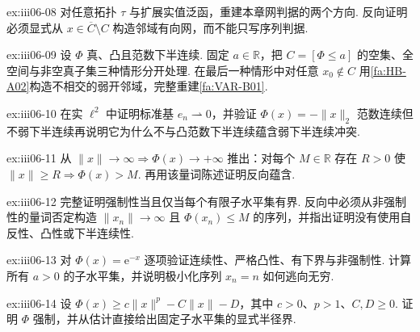 \begin{FAExercise}[网下极限判据]{ex:iii06-08}
对任意拓扑 \(\displaystyle\tau\) 与扩展实值泛函，重建本章网判据的两个方向. 反向证明必须显式从 \(\displaystyle x\in\overline C\setminus C\) 构造邻域有向网，而不能只写序列判据.
\end{FAExercise}

\begin{FAExercise}{ex:iii06-09}
设 \(\displaystyle\Phi\) 真、凸且范数下半连续. 固定 \(\displaystyle a\in\mathbb R\)，把 \(\displaystyle C=[\Phi\leqslant a]\) 的空集、全空间与非空真子集三种情形分开处理. 在最后一种情形中对任意 \(\displaystyle x_0\notin C\) 用\autoref{fa:HB-A02}构造不相交的弱开邻域，完整重建\autoref{fa:VAR-B01}.
\end{FAExercise}

\begin{FAExercise}[范数连续但非弱下半连续的反例]{ex:iii06-10}
在实 \(\displaystyle\ell^2\) 中证明标准基 \(\displaystyle e_n\rightharpoonup0\)，并验证 \(\displaystyle\Phi(x)=-\|x\|_2\) 范数连续但不弱下半连续再说明它为什么不与凸范数下半连续蕴含弱下半连续冲突.
\end{FAExercise}

\begin{FAExercise}[强制性的量词形式]{ex:iii06-11}
从 \(\displaystyle\|x\|\to\infty\Rightarrow\Phi(x)\to+\infty\) 推出：对每个 \(\displaystyle M\in\mathbb R\) 存在 \(\displaystyle R>0\) 使 \(\displaystyle\|x\|\geqslant R\Rightarrow\Phi(x)>M\). 再用该量词陈述证明反向蕴含.
\end{FAExercise}

\begin{FAExercise}[强制性与有限子水平集有界性的两个方向]{ex:iii06-12}
完整证明强制性当且仅当每个有限子水平集有界. 反向中必须从非强制性的量词否定构造 \(\displaystyle\|x_n\|\to\infty\) 且 \(\displaystyle\Phi(x_n)\leqslant M\) 的序列，并指出证明没有使用自反性、凸性或下半连续性.
\end{FAExercise}

\begin{FAExercise}[非强制性导致极小元逃逸的反例]{ex:iii06-13}
对 \(\displaystyle\Phi(x)=\mathrm{e}^{-x}\) 逐项验证连续性、严格凸性、有下界与非强制性. 计算所有 \(\displaystyle a>0\) 的子水平集，并说明极小化序列 \(\displaystyle x_n=n\) 如何逃向无穷.
\end{FAExercise}

\begin{FAExercise}[强制性增长估计]{ex:iii06-14}
设 \(\displaystyle\Phi(x)\geqslant c\|x\|^p-C\|x\|-D\)，其中 \(\displaystyle c>0\)、\(\displaystyle p>1\)、\(\displaystyle C,D\geqslant0\). 证明 \(\displaystyle\Phi\) 强制，并从估计直接给出固定子水平集的显式半径界.
\end{FAExercise}

